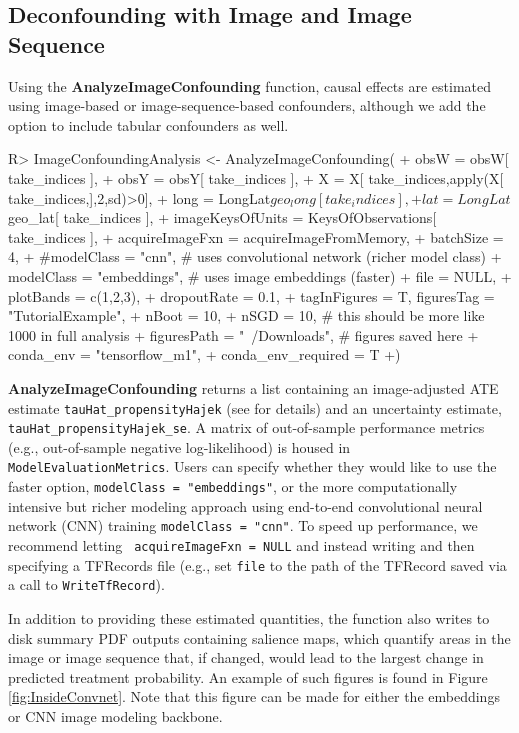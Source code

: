 \documentclass[nojss,shortnames]{jss} %
\begin{document}
\subsection{Deconfounding with Image and Image Sequence}\label{s:Confound}
Using the {\bf AnalyzeImageConfounding} function, causal effects are estimated using image-based or image-sequence-based confounders, although we add the option to include tabular confounders as well.

\begin{CodeChunk}
\begin{CodeInput}
R> ImageConfoundingAnalysis <- AnalyzeImageConfounding(
+    obsW = obsW[ take_indices ],
+    obsY = obsY[ take_indices ],
+    X = X[ take_indices,apply(X[ take_indices,],2,sd)>0],
+    long = LongLat$geo_long[ take_indices ],
+    lat = LongLat$geo_lat[ take_indices ],
+    imageKeysOfUnits = KeysOfObservations[ take_indices ],
+    acquireImageFxn = acquireImageFromMemory,
+    batchSize = 4,
+    #modelClass = "cnn", # uses convolutional network (richer model class)
+    modelClass = "embeddings", # uses image embeddings (faster)
+    file = NULL,
+    plotBands = c(1,2,3),
+    dropoutRate = 0.1,
+    tagInFigures = T, figuresTag = "TutorialExample",
+    nBoot = 10,
+    nSGD = 10, # this should be more like 1000 in full analysis
+    figuresPath = "~/Downloads", # figures saved here
+    conda_env = "tensorflow_m1", 
+    conda_env_required = T
+)
\end{CodeInput}
\end{CodeChunk}
{\bf AnalyzeImageConfounding} returns a list containing an image-adjusted ATE estimate \verb|tauHat_propensityHajek| (see \cite{jerzak2022estimating} for details) and an uncertainty estimate,
\verb|tauHat_propensityHajek_se|.
A matrix of out-of-sample performance metrics (e.g., out-of-sample negative log-likelihood) is housed in \verb|ModelEvaluationMetrics|. Users can specify whether they would like to use the faster option, \verb|modelClass = "embeddings"|, or the more computationally intensive but richer modeling approach using end-to-end convolutional neural network (CNN) training \verb|modelClass = "cnn"|. To speed up performance, we recommend letting \verb| acquireImageFxn = NULL| and instead writing and then specifying a TFRecords file  (e.g., set \verb|file| to the path of the TFRecord saved via a call to \verb|WriteTfRecord|).

In addition to providing these estimated quantities, the function also writes to disk summary PDF outputs containing salience maps, which quantify areas in the image or image sequence that, if changed, would lead to the largest change in predicted treatment probability. An example of such figures is found in Figure \ref{fig:InsideConvnet}. Note that this figure can be made for either the embeddings or CNN image modeling backbone. 
\end{document}
